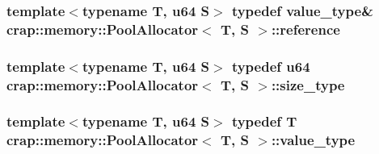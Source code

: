 \hypertarget{classcrap_1_1memory_1_1_pool_allocator_a0040a8887356f723907ec1dac0a88fe8}{
\subsubsection[{reference}]{\setlength{\rightskip}{0pt plus 5cm}template$<$typename T, u64 S$>$ typedef {\bf value\-\_\-type}\& {\bf crap\-::memory\-::\-Pool\-Allocator}$<$ T, S $>$\-::{\bf reference}}}\label{classcrap_1_1memory_1_1_pool_allocator_a0040a8887356f723907ec1dac0a88fe8}
\hypertarget{classcrap_1_1memory_1_1_pool_allocator_a867ec9bb97be57d8fdae439d38b6ea68}{
\subsubsection[{size\-\_\-type}]{\setlength{\rightskip}{0pt plus 5cm}template$<$typename T, u64 S$>$ typedef {\bf u64} {\bf crap\-::memory\-::\-Pool\-Allocator}$<$ T, S $>$\-::{\bf size\-\_\-type}}}\label{classcrap_1_1memory_1_1_pool_allocator_a867ec9bb97be57d8fdae439d38b6ea68}
\hypertarget{classcrap_1_1memory_1_1_pool_allocator_a48750c5fcf1b7ee89f09af6cf3af1e65}{
\subsubsection[{value\-\_\-type}]{\setlength{\rightskip}{0pt plus 5cm}template$<$typename T, u64 S$>$ typedef T {\bf crap\-::memory\-::\-Pool\-Allocator}$<$ T, S $>$\-::{\bf value\-\_\-type}}}\label{classcrap_1_1memory_1_1_pool_allocator_a48750c5fcf1b7ee89f09af6cf3af1e65}



